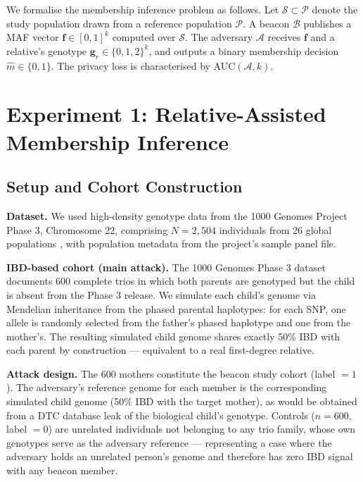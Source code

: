 \documentclass[conference]{IEEEtran}
\begin{document}
We formalise the membership inference problem as follows. Let
$\mathcal{S}\subset\mathcal{P}$ denote the study population drawn from a
reference population $\mathcal{P}$. A beacon $\mathcal{B}$ publishes a MAF
vector $\mathbf{f}\in[0,1]^k$ computed over $\mathcal{S}$. The adversary
$\mathcal{A}$ receives $\mathbf{f}$ and a relative's genotype
$\mathbf{g}_r\in\{0,1,2\}^k$, and outputs a binary membership decision
$\hat{m}\in\{0,1\}$. The privacy loss is characterised by
AUC$(\mathcal{A},k)$.

\section{Experiment 1: Relative-Assisted Membership Inference}

\subsection{Setup and Cohort Construction}

\textbf{Dataset.} We used high-density genotype data from the 1000 Genomes
Project Phase 3, Chromosome 22, comprising $N=2{,}504$ individuals from 26
global populations \cite{1000genomes2015}, with population metadata from the
project's sample panel file.

\textbf{IBD-based cohort (main attack).}
The 1000 Genomes Phase 3 dataset documents 600 complete trios in which both
parents are genotyped but the child is absent from the Phase 3 release. We
simulate each child's genome via Mendelian inheritance from the phased parental
haplotypes: for each SNP, one allele is randomly selected from the father's
phased haplotype and one from the mother's. The resulting simulated child genome
shares exactly 50\% IBD with each parent by construction --- equivalent to a
real first-degree relative.

\textbf{Attack design.} The 600 mothers constitute the beacon study cohort
(label $= 1$). The adversary's reference genome for each member is the
corresponding simulated child genome (50\% IBD with the target mother), as
would be obtained from a DTC database leak of the biological child's
genotype. Controls ($n=600$, label $= 0$) are unrelated individuals not
belonging to any trio family, whose own genotypes serve as the adversary
reference --- representing a case where the adversary holds an unrelated
person's genome and therefore has zero IBD signal with any beacon member.
\end{document}
